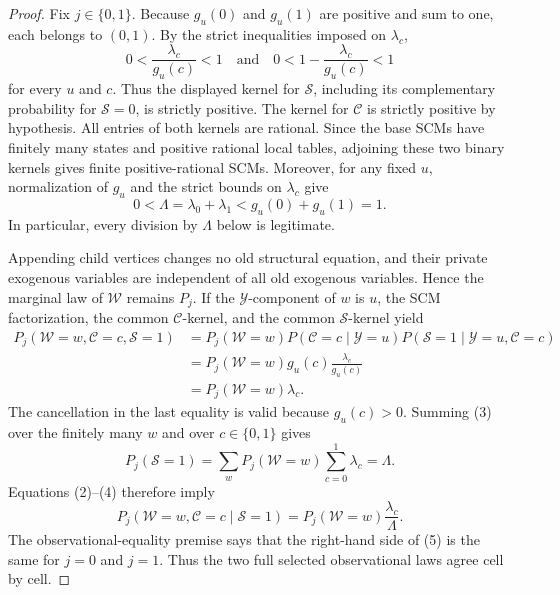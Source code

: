 \documentclass{article}
\begin{document}
\begin{proof}
Fix \(j\in\{0,1\}\). Because \(g_u(0)\) and \(g_u(1)\) are positive and sum to one, each belongs to \((0,1)\). By the strict inequalities imposed on \(\lambda_c\),
\[
 0<\frac{\lambda_c}{g_u(c)}<1
 \quad\text{and}\quad
 0<1-\frac{\lambda_c}{g_u(c)}<1                         \tag{1}
\]
for every \(u\) and \(c\). Thus the displayed kernel for \(\mathcal S\), including its complementary probability for \(\mathcal S=0\), is strictly positive. The kernel for \(\mathcal C\) is strictly positive by hypothesis. All entries of both kernels are rational. Since the base SCMs have finitely many states and positive rational local tables, adjoining these two binary kernels gives finite positive-rational SCMs. Moreover, for any fixed \(u\), normalization of \(g_u\) and the strict bounds on \(\lambda_c\) give
\[
 0<\Lambda=\lambda_0+\lambda_1
 <g_u(0)+g_u(1)=1.                                      \tag{2}
\]
In particular, every division by \(\Lambda\) below is legitimate.

Appending child vertices changes no old structural equation, and their private exogenous variables are independent of all old exogenous variables. Hence the marginal law of \(\mathcal W\) remains \(P_j\). If the \(\mathcal Y\)-component of \(w\) is \(u\), the SCM factorization, the common \(\mathcal C\)-kernel, and the common \(\mathcal S\)-kernel yield
\[
\begin{aligned}
 P_j(\mathcal W=w,\mathcal C=c,\mathcal S=1)
 &=P_j(\mathcal W=w)
   P(\mathcal C=c\mid\mathcal Y=u)
   P(\mathcal S=1\mid\mathcal Y=u,\mathcal C=c)\\
 &=P_j(\mathcal W=w)g_u(c)\frac{\lambda_c}{g_u(c)}\\
 &=P_j(\mathcal W=w)\lambda_c.                           \tag{3}
\end{aligned}
\]
The cancellation in the last equality is valid because \(g_u(c)>0\). Summing (3) over the finitely many \(w\) and over \(c\in\{0,1\}\) gives
\[
 P_j(\mathcal S=1)=\sum_wP_j(\mathcal W=w)
                    \sum_{c=0}^1\lambda_c
                  =\Lambda.                              \tag{4}
\]
Equations (2)--(4) therefore imply
\[
 P_j(\mathcal W=w,\mathcal C=c\mid\mathcal S=1)
 =P_j(\mathcal W=w)\frac{\lambda_c}{\Lambda}.            \tag{5}
\]
The observational-equality premise says that the right-hand side of (5) is the same for \(j=0\) and \(j=1\). Thus the two full selected observational laws agree cell by cell.


\end{proof}
\end{document}
